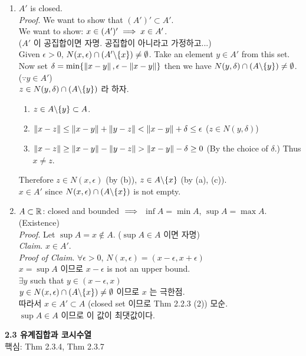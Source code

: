 \begin{enumerate}
	\item $A'$ is closed.\\
	\textit{Proof}. We want to show that $(A')' \subset A'$.\\
	We want to show: $x\in (A')' \implies x\in A'$.\\
	($A'$ 이 공집합이면 자명. 공집합이 아니라고 가정하고...)\\
	Given $\epsilon>0$, $N(x, \epsilon)\cap (A'\backslash \{x\}) \neq \emptyset$. Take an element $y\in A'$ from this set. Now set $\delta = \min\{\left\lVert x-y\right\rVert, \epsilon - \left\lVert x-y\right\rVert \}$ then we have $N(y, \delta) \cap (A\backslash \{y\}) \neq \emptyset$. ($\because y\in A'$)\\
	$z \in N(y, \delta) \cap (A\backslash \{y\})$ 라 하자.
	\begin{enumerate}
		\item $z\in A\backslash \{y\} \subset A$.
		\item $\left\lVert x-z\right\rVert \leq \left\lVert x-y\right\rVert + \left\lVert y-z\right\rVert < \left\lVert x-y\right\rVert +\delta \leq \epsilon$ ($z\in N(y, \delta)$)
		\item $\left\lVert x-z\right\rVert \geq \left\lVert x-y\right\rVert-\left\lVert y-z\right\rVert>\left\lVert x-y\right\rVert-\delta \geq 0$ (By the choice of $\delta$.) Thus $x\neq z$.
	\end{enumerate}
	Therefore $z\in N(x, \epsilon)$ (by (b)), $z\in A\backslash \{x\}$ (by (a), (c)).\\
	$x\in A'$ since $N(x, \epsilon)\cap (A\backslash \{x\})$ is not empty.
	\item $A\subset \mathbb{R}$: closed and bounded $\implies$ $\inf A = \min A$, $\sup A = \max A$. (Existence)\\
	\textit{Proof}. Let $\sup A=x\notin A$. ($\sup A\in A$ 이면 자명)\\
	\textit{Claim}. $x\in A'$.\\
	\textit{Proof of Claim}. $\forall \epsilon>0$, $N(x, \epsilon) = (x-\epsilon, x+\epsilon)$\\
	$x = \sup A$ 이므로 $x-\epsilon$ is not an upper bound.\\
	$\exists y$ such that $y \in (x-\epsilon, x)$\\
	$y\in N(x, \epsilon) \cap (A\backslash \{x\})\neq \emptyset$ 이므로 $x$ 는 극한점.\\
	따라서 $x\in A' \subset A$ (closed set 이므로 Thm 2.2.3 (2)) 모순. \\
	$\sup A\in A$ 이므로 이 값이 최댓값이다. 
\end{enumerate}
\pagebreak
\textbf{2.3 유계집합과 코시수열}\\
핵심: Thm 2.3.4, Thm 2.3.7\\
